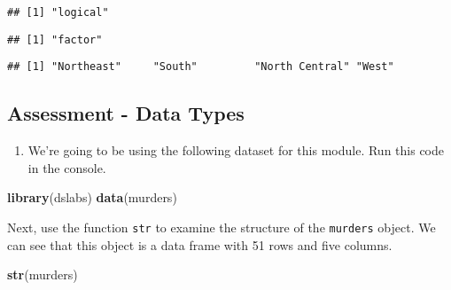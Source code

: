 \documentclass[
]{article}
\newenvironment{Shaded}{\begin{snugshade}}{\end{snugshade}}
\newcommand{\CommentTok}[1]{\textcolor[rgb]{0.56,0.35,0.01}{\textit{#1}}}
\newcommand{\KeywordTok}[1]{\textcolor[rgb]{0.13,0.29,0.53}{\textbf{#1}}}
\newcommand{\NormalTok}[1]{#1}
\newcommand{\OperatorTok}[1]{\textcolor[rgb]{0.81,0.36,0.00}{\textbf{#1}}}
\providecommand{\tightlist}{%
  \setlength{\itemsep}{0pt}\setlength{\parskip}{0pt}}
\begin{document}
\begin{verbatim}
## [1] "logical"
\end{verbatim}

\begin{Shaded}
\end{Shaded}

\begin{verbatim}
## [1] "factor"
\end{verbatim}

\begin{Shaded}
\end{Shaded}

\begin{verbatim}
## [1] "Northeast"     "South"         "North Central" "West"
\end{verbatim}

\hypertarget{assessment---data-types}{%
\subsection{Assessment - Data Types}\label{assessment---data-types}}

\begin{enumerate}
\def\labelenumi{\arabic{enumi}.}
\tightlist
\item
  We're going to be using the following dataset for this module. Run
  this code in the console.
\end{enumerate}

\begin{Shaded}
\begin{Highlighting}[]
\KeywordTok{library}\NormalTok{(dslabs)  }
\KeywordTok{data}\NormalTok{(murders)}
\end{Highlighting}
\end{Shaded}

Next, use the function \texttt{str} to examine the structure of the
\texttt{murders} object. We can see that this object is a data frame
with 51 rows and five columns.

\begin{Shaded}
\begin{Highlighting}[]
\KeywordTok{str}\NormalTok{(murders)}
\end{Highlighting}
\end{Shaded}
\end{document}
